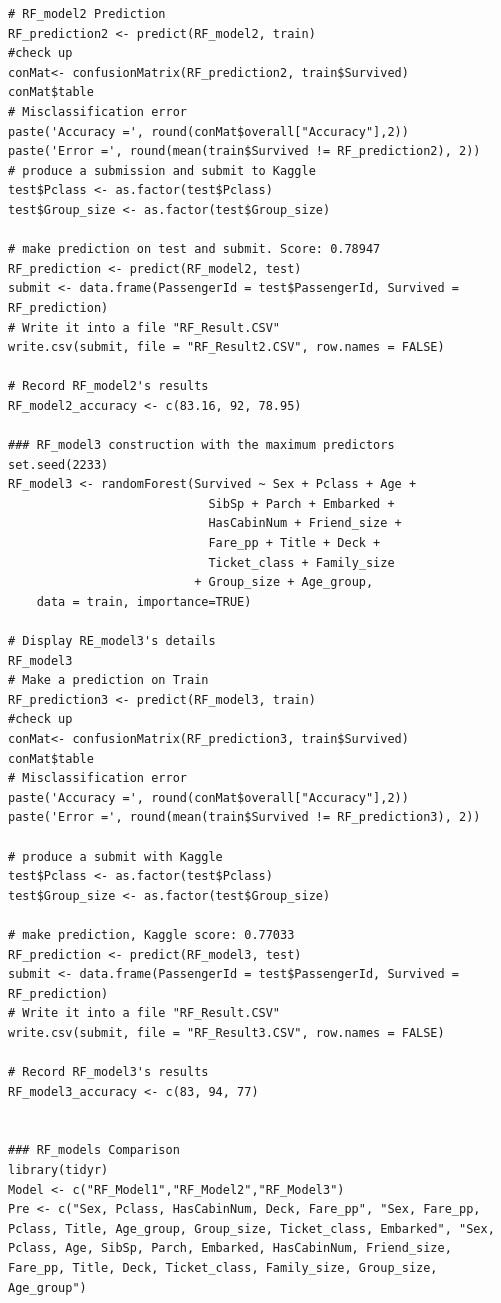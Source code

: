 \documentclass[
]{book}
\begin{document}
\begin{verbatim}
# RF_model2 Prediction
RF_prediction2 <- predict(RF_model2, train)
#check up
conMat<- confusionMatrix(RF_prediction2, train$Survived)
conMat$table
# Misclassification error
paste('Accuracy =', round(conMat$overall["Accuracy"],2))
paste('Error =', round(mean(train$Survived != RF_prediction2), 2))
# produce a submission and submit to Kaggle
test$Pclass <- as.factor(test$Pclass)
test$Group_size <- as.factor(test$Group_size)

# make prediction on test and submit. Score: 0.78947
RF_prediction <- predict(RF_model2, test)
submit <- data.frame(PassengerId = test$PassengerId, Survived = RF_prediction)
# Write it into a file "RF_Result.CSV"
write.csv(submit, file = "RF_Result2.CSV", row.names = FALSE)

# Record RF_model2's results
RF_model2_accuracy <- c(83.16, 92, 78.95)

### RF_model3 construction with the maximum predictors
set.seed(2233)
RF_model3 <- randomForest(Survived ~ Sex + Pclass + Age +
                            SibSp + Parch + Embarked +
                            HasCabinNum + Friend_size +
                            Fare_pp + Title + Deck +
                            Ticket_class + Family_size
                          + Group_size + Age_group,
    data = train, importance=TRUE)

# Display RE_model3's details
RF_model3
# Make a prediction on Train
RF_prediction3 <- predict(RF_model3, train)
#check up
conMat<- confusionMatrix(RF_prediction3, train$Survived)
conMat$table
# Misclassification error
paste('Accuracy =', round(conMat$overall["Accuracy"],2))
paste('Error =', round(mean(train$Survived != RF_prediction3), 2))

# produce a submit with Kaggle
test$Pclass <- as.factor(test$Pclass)
test$Group_size <- as.factor(test$Group_size)

# make prediction, Kaggle score: 0.77033
RF_prediction <- predict(RF_model3, test)
submit <- data.frame(PassengerId = test$PassengerId, Survived = RF_prediction)
# Write it into a file "RF_Result.CSV"
write.csv(submit, file = "RF_Result3.CSV", row.names = FALSE)

# Record RF_model3's results
RF_model3_accuracy <- c(83, 94, 77)


### RF_models Comparison
library(tidyr)
Model <- c("RF_Model1","RF_Model2","RF_Model3")
Pre <- c("Sex, Pclass, HasCabinNum, Deck, Fare_pp", "Sex, Fare_pp, Pclass, Title, Age_group, Group_size, Ticket_class, Embarked", "Sex, Pclass, Age, SibSp, Parch, Embarked, HasCabinNum, Friend_size, Fare_pp, Title, Deck, Ticket_class, Family_size, Group_size, Age_group")


\end{verbatim}
\end{document}
